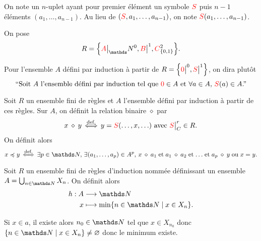 \begin{rmk}[Notation]
	On note un $n$-uplet ayant pour premier élément un symbole ${\color{red}S}$\/ puis $n-1$\/ éléments $(a_1, \ldots, a_{n-1})$. Au lieu de $({\color{red}S}, a_1, \ldots, a_{n-1})$, on note ${\color{red}S}(a_1, \ldots, a_{n-1})$.
\end{rmk}

\begin{exm}
	On pose \[
		R = \Big\{\red A\big|_\N^0,\red B\big|^1, \red C^2_{\{0,1\}}\Big\}
	.\]
\end{exm}

\begin{rmk}
	Pour l'ensemble $A$\/ défini par induction à partir de $R = \Big\{{\color{red}0}\big|^0, {\color{red}S}\big|^1\Big\}$, on dira plutôt \[
		\text{``Soit $A$\/ l'ensemble défini par induction tel que ${\color{red}0} \in A$\/ et $\forall a \in A,\,{\color{red}S}(a) \in A$.''}
	\]
\end{rmk}

\begin{defn}
	Soit $R$\/ un ensemble fini de règles et $A$\/ l'ensemble défini par induction à partir de ces règles. Sur $A$, on définit la relation binaire $\diamond$\/ par \[
		x \mathrel{\diamond} y \iffdef y = \red S(\ldots, x, \ldots) \text{ avec } \red S\big|_C^r \in R
	.\]
	On définit alors \[
		x \preceq y \iffdef \exists p \in \N,\,\exists (a_1, \ldots, a_p) \in A^p,\,x \mathrel{\diamond} a_1 \mathrel{\text{et}} a_1 \mathrel{\diamond} a_2 \mathrel{\text{et}} \ldots \mathrel{\text{et}} a_p \mathrel{\diamond} y \mathrel{\text{ou}} x = y
	.\]
\end{defn}

\begin{defn}[hauteur]
	Soit $R$\/ un ensemble fini de règles d'induction nommée définissant un ensemble $A = \bigcup_{n \in \N} X_n$. On définit alors \begin{align*}
		h: A &\longrightarrow \N \\
		x &\longmapsto \min \{n \in \N \mid x \in X_n\}.
	\end{align*}
\end{defn}

\begin{rmk}
	Si $x \in a$, il existe alors $n_0 \in \N$\/ tel que $x \in X_{n_0}$\/ donc $\{n \in \N \mid x \in X_n\} \neq \O$\/ donc le minimum existe.
\end{rmk}

